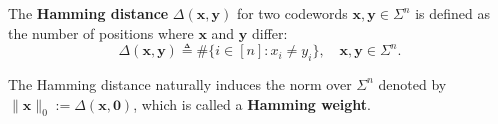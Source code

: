 \documentclass{test-template}
\begin{document}
\begin{definition}
    The \textbf{Hamming distance} $\Delta(\mathbf{x},\mathbf{y})$ for two
    codewords $\mathbf{x},\mathbf{y} \in \Sigma^n$ is defined as the number of
    positions where $\mathbf{x}$ and $\mathbf{y}$ differ:
    \begin{equation*}
        \Delta(\mathbf{x},\mathbf{y}) \triangleq \#\{i \in [n]: x_i \neq y_i\}, \quad \mathbf{x},\mathbf{y} \in \Sigma^n.
    \end{equation*}

    The Hamming distance naturally induces the norm over $\Sigma^n$ denoted by
    $\|\mathbf{x}\|_0 := \Delta(\mathbf{x},\mathbf{0})$, which is called a
    \textbf{Hamming weight}.
\end{definition}
\end{document}
